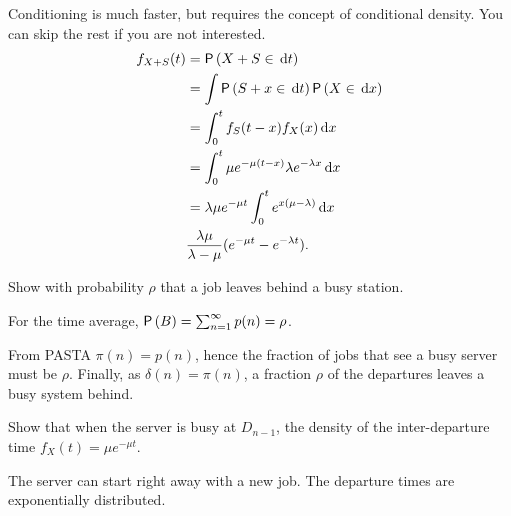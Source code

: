 \begin{exercise}
\begin{solution}
Conditioning is much faster, but requires the concept of conditional density. You can skip the rest if you are not interested. 
    \begin{align*}
    f_{X+S}(t) 
&= \P{X+S\in \d{t}} \\
&= \int \P{S+x\in \d{t}}\P{X\in \d{x}} \\
&=\int_0^t f_S(t-x) f_X(x) \d{x} \\
     &= \int_0^t \mu e^{-\mu(t-x)} \lambda e^{-\lambda x} \d{x} \\
     &= \lambda \mu e^{-\mu t} \int_0^t  e^{x(\mu-\lambda)} \d{x} \\
& \frac{\lambda \mu}{\lambda - \mu} (e^{-\mu t} - e^{-\lambda t}).
    \end{align*}
    \end{solution}
\end{exercise}

\begin{exercise}
Show with  probability $\rho$ that a job leaves behind a busy station.
    \begin{solution}
For the time average, 
        $\P B = \sum_{n=1}^\infty p(n) = \rho$.
    \end{solution}
From PASTA $\pi(n) = p(n)$, hence the fraction of jobs that see a busy server must be $\rho$. Finally, as $\delta(n) = \pi(n)$, a fraction $\rho$ of the departures leaves a busy system behind.
\end{exercise}

\begin{exercise}
Show  that when the server is busy at $D_{n-1}$, the density of the inter-departure time  $f_X(t) = \mu e^{-\mu t}$.
    \begin{solution}
The server can start right away with a new job. The departure times are exponentially distributed. 
    \end{solution}
\end{exercise}


